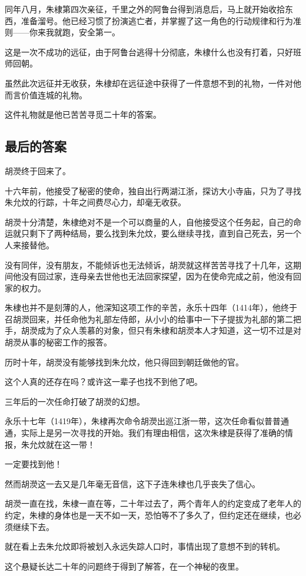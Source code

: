 \begin{multicols}{\theparacolNo}
同年八月，朱棣第四次亲征，千里之外的阿鲁台得到消息后，马上就开始收拾东西，准备溜号。他已经习惯了扮演逃亡者，并掌握了这一角色的行动规律和行为准则——你来我就跑，安全第一。

这是一次不成功的远征，由于阿鲁台逃得十分彻底，朱棣什么也没有打着，只好班师回朝。

虽然此次远征并无收获，朱棣却在远征途中获得了一件意想不到的礼物，一件对他而言价值连城的礼物。

这件礼物就是他已苦苦寻觅二十年的答案。

\subsection{最后的答案}
胡濙终于回来了。

十六年前，他接受了秘密的使命，独自出行两湖江浙，探访大小寺庙，只为了寻找朱允炆的行踪，十年之间费尽心力，却毫无收获。

胡濙十分清楚，朱棣绝对不是一个可以商量的人，自他接受这个任务起，自己的命运就只剩下了两种结局，要么找到朱允炆，要么继续寻找，直到自己死去，另一个人来接替他。

没有同伴，没有朋友，不能倾诉也无法倾诉，胡濙就这样苦苦寻找了十几年，这期间他没有回过家，连母亲去世他也无法回家探望，因为在使命完成之前，他没有回家的权力。

朱棣也并不是刻薄的人，他深知这项工作的辛苦，永乐十四年（1414年），他终于召胡濙回来，并任命他为礼部左侍郎，从小小的给事中一下子提拔为礼部的第二把手，胡濙成为了众人羡慕的对象，但只有朱棣和胡濙本人才知道，这一切不过是对胡濙从事的秘密工作的报答。

历时十年，胡濙没有能够找到朱允炆，他只得回到朝廷做他的官。

这个人真的还存在吗？或许这一辈子也找不到他了吧。

三年后的一次任命打破了胡濙的幻想。

永乐十七年（1419年），朱棣再次命令胡濙出巡江浙一带，这次任命看似普普通通，实际上是另一次寻找的开始。我们有理由相信，这次朱棣是获得了准确的情报，朱允炆就在这一带！

一定要找到他！

然而胡濙这一去又是几年毫无音信，这下子连朱棣也几乎丧失了信心。

胡濙一直在找，朱棣一直在等，二十年过去了，两个青年人的约定变成了老年人的约定，朱棣的身体也是一天不如一天，恐怕等不了多久了，但约定还在继续，也必须继续下去。

就在看上去朱允炆即将被划入永远失踪人口时，事情出现了意想不到的转机。

这个悬疑长达二十年的问题终于得到了解答，在一个神秘的夜里。


\end{multicols}
